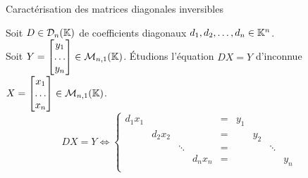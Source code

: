\documentclass{article}
\renewenvironment{question_kholle}[2][ ]
{
	\subsection{\texorpdfstring{#2}{}}
	\notblank{#1}
	{
		\noindent #1
		\bigbreak
	}
	{}
	\begin{proof}
}
{
	\end{proof}
}
\begin{document}
\begin{question_kholle}
	[Une matrice diagonale est inversible si et seulement si tous ses coefficients diagonaux sont non nuls.
		\begin{equation}
			\forall D = diag(d_1, d_2, \ldots, d_n) \in \mathcal{D}_n(\K),
			D \in \mathcal{GL}_n(\K) \iff \prod_{i=1}^{n} d_i \neq 0
		\end{equation}]
	{Caractérisation des matrices diagonales inversibles}

	Soit $D \in \mathcal{D}_n(\mathbb K)$ de coefficients diagonaux $d_1, d_2, \ldots, d_n \in \mathbb K^n$. \\
	Soit $Y = \begin{bmatrix} y_1 \\ \ldots \\ y_n \end{bmatrix} \in \mathcal{M}_{n,1}(\mathbb K)$.
	\'Etudions l'équation $DX = Y$ d'inconnue $X = \begin{bmatrix} x_1 \\ \ldots \\ x_n \end{bmatrix} \in \mathcal{M}_{n,1}(\mathbb K)$.
	\begin{equation*}
		DX = Y \iff
		\left\{ \begin{array}{cccccccccc}
			d_1 x_1 &         &        &         & = & y_1 &     &        &       \\
			        & d_2 x_2 &        &         & = &     & y_2 &        &     & \\
			        &         & \ddots &         & = &     &     & \ddots &       \\
			        &         &        & d_n x_n & = &     &     &        & y_n   \\
		\end{array} \right.
	\end{equation*}


\end{question_kholle}
\end{document}
